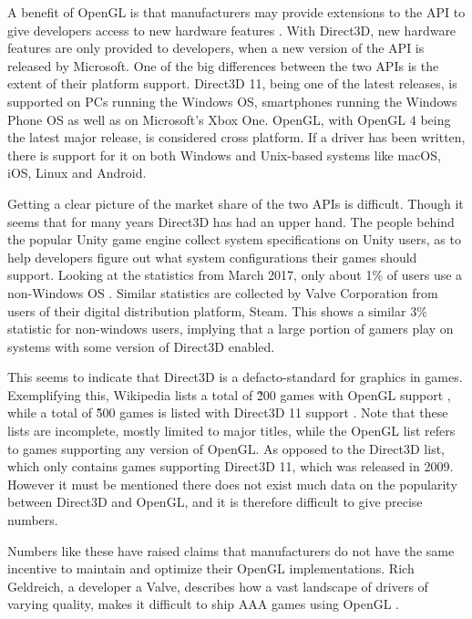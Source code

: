 A benefit of OpenGL is that manufacturers may provide extensions to the \gls{API} to give developers access to new hardware features \cite{openGLExtensions}.
With Direct3D, new hardware features are only provided to developers, when a new version of the \gls{API} is released by Microsoft. 
One of the big differences between the two \glspl{API} is the extent of their platform support.
Direct3D 11, being one of the latest releases, is supported on PCs running the Windows \gls{OS}, smartphones running the Windows Phone \gls{OS} as well as on Microsoft’s Xbox One.
OpenGL, with OpenGL 4 being the latest major release, is considered cross platform.
If a driver has been written, there is support for it on both Windows and Unix-based systems like macOS, iOS, Linux and Android. 

Getting a clear picture of the market share of the two \glspl{API} is difficult.
Though it seems that for many years Direct3D has had an upper hand.
The people behind the popular Unity game engine collect system specifications on Unity users, as to help developers figure out what system configurations their games should support.
Looking at the statistics from March 2017, only about 1\% of users use a non-Windows \gls{OS} \cite{unityStats}.
Similar statistics are collected by Valve Corporation from users of their digital distribution platform, Steam.
This shows a similar 3\% statistic for non-windows users\cite{steamStats}, implying that a large portion of gamers play on systems with some version of Direct3D enabled.

This seems to indicate that Direct3D is a defacto-standard for graphics in games. 
Exemplifying this, Wikipedia lists a total of \~200 games with OpenGL support \cite{wikiOpenGLGames}, while a total of \~500 games is listed with Direct3D 11 support \cite{
DX11Games}. 
Note that these lists are incomplete, mostly limited to major titles, while the OpenGL list refers to games supporting any version of OpenGL.
As opposed to the Direct3D list, which only contains games supporting Direct3D 11, which was released in 2009.
However it must be mentioned there does not exist much data on the popularity between Direct3D and OpenGL, and it is therefore difficult to give precise numbers.
   
Numbers like these have raised claims that manufacturers do not have the same incentive to maintain and optimize their OpenGL implementations.
Rich Geldreich, a developer a Valve, describes how a vast landscape of drivers of varying quality, makes it difficult to ship AAA games using OpenGL \cite{openGLDriverQuality}.
 
